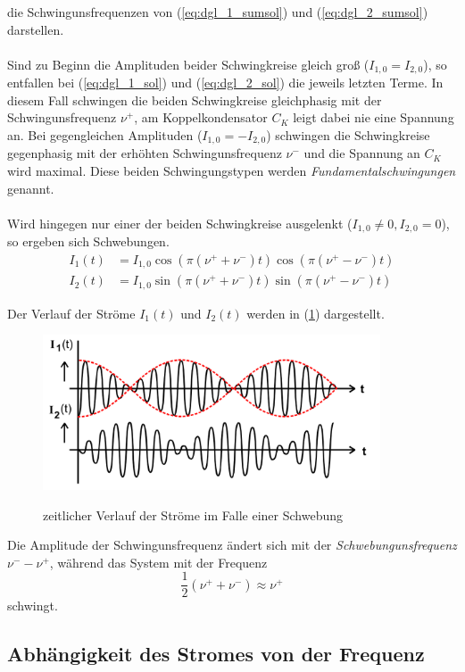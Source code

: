 die Schwingunsfrequenzen von (\ref{eq:dgl_1_sumsol}) und (\ref{eq:dgl_2_sumsol}) darstellen. \\
\\
Sind zu Beginn die Amplituden beider Schwingkreise gleich groß ($I_{1,0} = I_{2,0}$), so entfallen bei (\ref{eq:dgl_1_sol}) und (\ref{eq:dgl_2_sol})
die jeweils letzten Terme. In diesem Fall schwingen die beiden Schwingkreise gleichphasig mit der Schwingunsfrequenz $\nu^+$, am
Koppelkondensator $C_{K}$ leigt dabei nie eine Spannung an. Bei gegengleichen Amplituden ($I_{1,0} = -I_{2,0}$) schwingen die Schwingkreise gegenphasig
mit der erhöhten Schwingunsfrequenz $\nu^-$ und die Spannung an $C_{K}$ wird maximal. Diese beiden Schwingungstypen werden \textit{Fundamentalschwingungen} genannt. \\
\\
Wird hingegen nur einer der beiden Schwingkreise ausgelenkt ($I_{1,0} \neq 0, I_{2,0} = 0$), so ergeben sich Schwebungen.
\begin{align}
    I_{1}(t) &= I_{1,0} \cos(\pi (\nu^+ + \nu^-) t) \cos(\pi (\nu^+ - \nu^-) t) \label{eq:dgl_1_sol_schweb} \\
    I_{2}(t) &= I_{1,0} \sin(\pi (\nu^+ + \nu^-) t) \sin(\pi (\nu^+ - \nu^-) t) \label{eq:dgl_2_sol_schweb} 
\end{align}

Der Verlauf der Ströme $I_{1}(t)$ und $I_{2}(t)$ werden in (\ref{fig:schwebung}) dargestellt.

\begin{figure} 
    \centering
    \includegraphics[width=10cm] {pictures/schwebung.png} \cite{v355} 
    \caption{zeitlicher Verlauf der Ströme im Falle einer Schwebung}
    \label{fig:schwebung}
\end{figure} 

Die Amplitude der Schwingunsfrequenz ändert sich mit der \textit{Schwebungunsfrequenz} $\nu^- - \nu^+$, während das System mit der Frequenz
\begin{equation}
    \frac{1}{2} \left( \nu^+ + \nu^- \right) \approx \nu^+ 
\end{equation}
schwingt.

\subsection {Abhängigkeit des Stromes von der Frequenz}